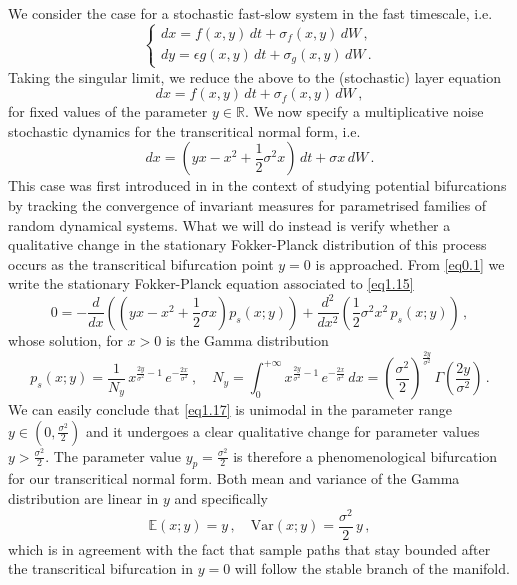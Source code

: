 \documentclass[../main.tex]{subfiles}
\begin{document}
\begin{example}[label=ex1.3]{}{}
     We consider the case for a stochastic fast-slow system in the fast timescale, i.e.
     \begin{equation*}
        \begin{cases}
            dx = f(x,y)\,dt + \sigma_{f}(x,y)\,dW\,, \\
            dy = \epsilon g(x,y)\,dt + \sigma_{g}(x,y)\,dW\,. 
        \end{cases}
     \end{equation*}
     Taking the singular limit, we reduce the above to the (stochastic) layer equation
     \begin{equation*}
         dx =  f(x,y)\,dt + \sigma_{f}(x,y)\,dW\,,
     \end{equation*}
     for fixed values of the parameter $y\in \mathbb{R}$. We now specify a multiplicative noise stochastic dynamics for the transcritical normal form, i.e.
     \begin{equation}\label{eq1.15}
         dx = (yx - x^{2} + \frac{1}{2}\sigma^{2}x)\,dt + \sigma x\,dW\,. 
     \end{equation}
     This case was first introduced in \cite{Arnold98} in the context of studying potential bifurcations by tracking the convergence of invariant measures for parametrised families of random dynamical systems. 
     What we will do instead is verify whether a qualitative change in the stationary Fokker-Planck distribution of this process occurs as the transcritical bifurcation point $y=0$ is approached. From \eqref{eq0.1} we write the stationary Fokker-Planck equation associated to \eqref{eq1.15}
     \begin{equation}\label{eq1.16}
          0 = -\frac{d}{dx}((yx - x^{2} + \frac{1}{2}\sigma x)p_{s}(x; y)) + \frac{d^{2}}{dx^{2}}(\frac{1}{2}\sigma^{2}x^{2}\,p_{s}(x; y))\,,
     \end{equation}
     whose solution, for $x>0$ is the Gamma distribution
     \begin{equation}\label{eq1.17}
          p_{s}(x; y) = \frac{1}{N_{y}}\,x^{\frac{2y}{\sigma^{2}}-1}\,e^{-\frac{2x}{\sigma^{2}}}\,,\quad N_{y}=\int_{0}^{+\infty} x^{\frac{2y}{\sigma^{2}}-1}\,e^{-\frac{2x}{\sigma^{2}}}\,dx = (\frac{\sigma^{2}}{2})^{\frac{2y}{\sigma^{2}}}\,\Gamma(\frac{2y}{\sigma^{2}})\,. 
     \end{equation}
     We can easily conclude that \eqref{eq1.17} is unimodal in the parameter range $y\in(0, \frac{\sigma^{2}}{2})$ and it undergoes a clear qualitative change for parameter values $y>\frac{\sigma^{2}}{2}$. The parameter value $y_{p}=\frac{\sigma^{2}}{2}$ is therefore a phenomenological bifurcation for our transcritical normal form. 
     Both mean and variance of the Gamma distribution are linear in $y$ and specifically
     \begin{equation*}
         \mathbb{E}(x; y)=y\,,\quad \text{Var}(x; y) = \frac{\sigma^{2}}{2}\,y\,,
     \end{equation*}
     which is in agreement with the fact that sample paths that stay bounded after the transcritical bifurcation in $y=0$ will follow the stable branch of the manifold. 
\end{example}
\end{document}
